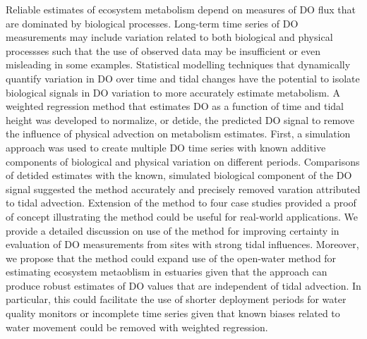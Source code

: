 Reliable estimates of ecosystem metabolism depend on measures of \ac{DO} flux that are dominated by biological processes.  Long-term time series of \ac{DO} measurements may include variation related to both biological and physical processses such that the use of observed data may be insufficient or even misleading in some examples.  Statistical modelling techniques that dynamically quantify variation in \ac{DO} over time and tidal changes have the potential to isolate biological signals in \ac{DO} variation to more accurately estimate metabolism.  A weighted regression method that estimates \ac{DO} as a function of time and tidal height was developed to normalize, or detide, the predicted \ac{DO} signal to remove the influence of physical advection on metabolism estimates.  First, a simulation approach was used to create multiple \ac{DO} time series with known additive components of biological and physical variation on different periods.  Comparisons of detided estimates with the known, simulated biological component of the \ac{DO} signal suggested the method accurately and precisely removed varation attributed to tidal advection.  Extension of the method to four case studies provided a proof of concept illustrating the method could be useful for real-world applications. We provide a detailed discussion on use of the method for improving certainty in evaluation of \ac{DO} measurements from sites with strong tidal influences.  Moreover, we propose that the method could expand use of the open-water method for estimating ecosystem metaoblism in estuaries given that the approach can produce robust estimates of \ac{DO} values that are independent of tidal advection.  In particular, this could facilitate the use of shorter deployment periods for water quality monitors or incomplete time series given that known biases related to water movement could be removed with weighted regression. 